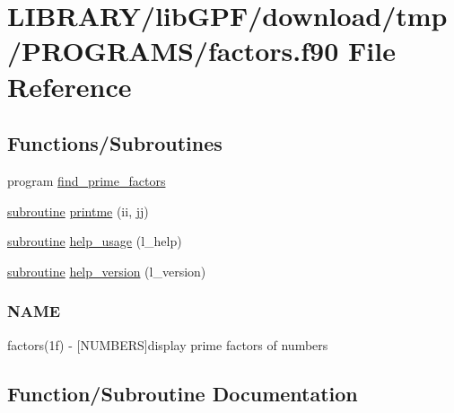 \hypertarget{factors_8f90}{}\section{L\+I\+B\+R\+A\+R\+Y/lib\+G\+P\+F/download/tmp/\+P\+R\+O\+G\+R\+A\+M\+S/factors.f90 File Reference}
\label{factors_8f90}
\subsection*{Functions/\+Subroutines}
\begin{DoxyCompactItemize}
\item 
program \hyperlink{factors_8f90_a01d59471a125202c8c43d68f82dd84f9}{find\+\_\+prime\+\_\+factors}
\item 
\hyperlink{M__stopwatch_83_8txt_acfbcff50169d691ff02d4a123ed70482}{subroutine} \hyperlink{factors_8f90_a96d1688b4d46c7b9dfe3e34cf97426a6}{printme} (ii, jj)
\item 
\hyperlink{M__stopwatch_83_8txt_acfbcff50169d691ff02d4a123ed70482}{subroutine} \hyperlink{factors_8f90_a3e09a3b52ee8fb04eeb93fe5761626a8}{help\+\_\+usage} (l\+\_\+help)
\item 
\hyperlink{M__stopwatch_83_8txt_acfbcff50169d691ff02d4a123ed70482}{subroutine} \hyperlink{factors_8f90_a39c21619b08a3c22f19e2306efd7f766}{help\+\_\+version} (l\+\_\+version)
\begin{DoxyCompactList}\small\item\em \subsubsection*{N\+A\+ME}

factors(1f) -\/ \mbox{[}N\+U\+M\+B\+E\+RS\mbox{]}display prime factors of numbers \end{DoxyCompactList}\end{DoxyCompactItemize}


\subsection{Function/\+Subroutine Documentation}
\mbox{\label{factors_8f90_a01d59471a125202c8c43d68f82dd84f9}} 
